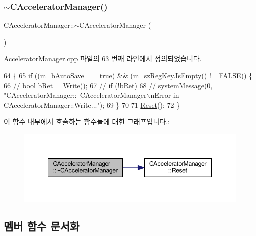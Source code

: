 \subsubsection{\texorpdfstring{$\sim$\+C\+Accelerator\+Manager()}{~CAcceleratorManager()}}
{\footnotesize\ttfamily C\+Accelerator\+Manager\+::$\sim$\+C\+Accelerator\+Manager (\begin{DoxyParamCaption}{ }\end{DoxyParamCaption})\hspace{0.3cm}{\ttfamily [virtual]}}



Accelerator\+Manager.\+cpp 파일의 63 번째 라인에서 정의되었습니다.


\begin{DoxyCode}
64 \{
65   \textcolor{keywordflow}{if} ((\mbox{\hyperlink{class_c_accelerator_manager_a37b504c74c13ca2d62eea8abffe73102}{m\_bAutoSave}} == \textcolor{keyword}{true}) && (\mbox{\hyperlink{class_c_accelerator_manager_a03a6d0e43bcfb63cf1a23ad12cb5aa35}{m\_szRegKey}}.IsEmpty() != FALSE)) \{
66     \textcolor{comment}{//          bool bRet = Write();}
67     \textcolor{comment}{//          if (!bRet)}
68     \textcolor{comment}{//                  systemMessage(0, "CAcceleratorManager::~CAcceleratorManager\(\backslash\)nError in
       CAcceleratorManager::Write...");}
69   \}
70 
71   \mbox{\hyperlink{class_c_accelerator_manager_aca456cda1a5f9b17bcfaea4f8ff45903}{Reset}}();
72 \}
\end{DoxyCode}
이 함수 내부에서 호출하는 함수들에 대한 그래프입니다.\+:
\nopagebreak
\begin{figure}[H]
\begin{center}
\leavevmode
\includegraphics[width=348pt]{class_c_accelerator_manager_ab46a50eed0acc653852961ac02f4ecb4_cgraph}
\end{center}
\end{figure}


\subsection{멤버 함수 문서화}
\mbox{\label{class_c_accelerator_manager_ac9e0e988625c9687666a9f582f9b3536}} 
